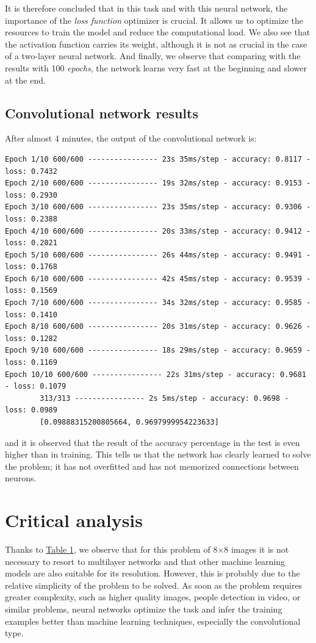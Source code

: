 \documentclass[11pt,a4paper]{article}
\begin{document}
It is therefore concluded that in this task and with this neural network, the importance of the \textit{loss function} optimizer is crucial. It allows us to optimize the resources to train the model and reduce the computational load. We also see that the activation function carries its weight, although it is not as crucial in the case of a two-layer neural network. And finally, we observe that comparing with the results with 100 \textit{epochs}, the network learns very fast at the beginning and slower at the end.

\subsection{Convolutional network results} After almost 4 minutes, the output of the convolutional network is:
{\footnotesize
\begin{verbatim}   
Epoch 1/10 600/600 ---------------- 23s 35ms/step - accuracy: 0.8117 - loss: 0.7432
Epoch 2/10 600/600 ---------------- 19s 32ms/step - accuracy: 0.9153 - loss: 0.2930
Epoch 3/10 600/600 ---------------- 23s 35ms/step - accuracy: 0.9306 - loss: 0.2388
Epoch 4/10 600/600 ---------------- 20s 33ms/step - accuracy: 0.9412 - loss: 0.2021
Epoch 5/10 600/600 ---------------- 26s 44ms/step - accuracy: 0.9491 - loss: 0.1768
Epoch 6/10 600/600 ---------------- 42s 45ms/step - accuracy: 0.9539 - loss: 0.1569
Epoch 7/10 600/600 ---------------- 34s 32ms/step - accuracy: 0.9585 - loss: 0.1410
Epoch 8/10 600/600 ---------------- 20s 31ms/step - accuracy: 0.9626 - loss: 0.1282
Epoch 9/10 600/600 ---------------- 18s 29ms/step - accuracy: 0.9659 - loss: 0.1169
Epoch 10/10 600/600 ---------------- 22s 31ms/step - accuracy: 0.9681 - loss: 0.1079
        313/313 ---------------- 2s 5ms/step - accuracy: 0.9698 - loss: 0.0989
        [0.09888315200805664, 0.9697999954223633]
\end{verbatim}}
\noindent and it is observed that the result of the accuracy percentage in the test is even higher than in training. This tells us that the network has clearly learned to solve the problem; it has not overfitted and has not memorized connections between neurons.

\section{Critical analysis}

Thanks to \hyperref[c1]{Table 1}, we observe that for this problem of 8$\times$8 images it is not necessary to resort to multilayer networks and that other machine learning models are also suitable for its resolution. However, this is probably due to the relative simplicity of the problem to be solved. As soon as the problem requires greater complexity, such as higher quality images, people detection in video, or similar problems, neural networks optimize the task and infer the training examples better than machine learning techniques, especially the convolutional type.
\end{document}
